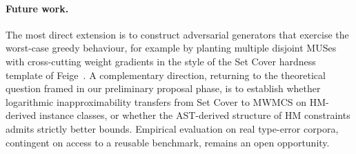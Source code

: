 \paragraph{Future work.}
The most direct extension is to construct adversarial generators that
exercise the worst-case greedy behaviour, for example by planting multiple
disjoint MUSes with cross-cutting weight gradients in the style of the Set
Cover hardness template of Feige~\cite{feige1998}. A complementary direction,
returning to the theoretical question framed in our preliminary
proposal phase, is to establish whether logarithmic inapproximability
transfers from Set Cover to MWMCS on HM-derived instance classes, or whether
the AST-derived structure of HM constraints admits strictly better bounds.
Empirical evaluation on real type-error corpora, contingent on access to a
reusable benchmark, remains an open opportunity.